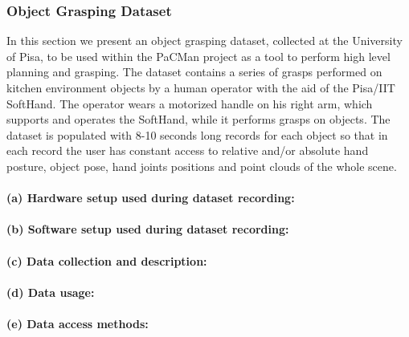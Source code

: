 
\subsubsection{Object Grasping Dataset}
\label{sec:ObjectGraspingDataset}

In this section we present an object grasping dataset, collected at the University of Pisa, to be used within the PaCMan project as a tool to perform high level planning and grasping.
The dataset contains a series of grasps performed on kitchen environment objects by a human operator with the aid of the Pisa/IIT SoftHand. The operator wears
a motorized handle on his right arm, which supports and operates the SoftHand, while it performs grasps on objects. 
The dataset is populated with 8-10 seconds long records for each object so that in each record the user has constant access to relative and/or absolute hand posture, object pose, hand joints positions 
and point clouds of the whole scene. %

\paragraph{(a) Hardware setup used during dataset recording:}
\paragraph{(b) Software setup used during dataset recording:}
\paragraph{(c) Data collection and description:}
\paragraph{(d) Data usage:}
\paragraph{(e) Data access methods:}




